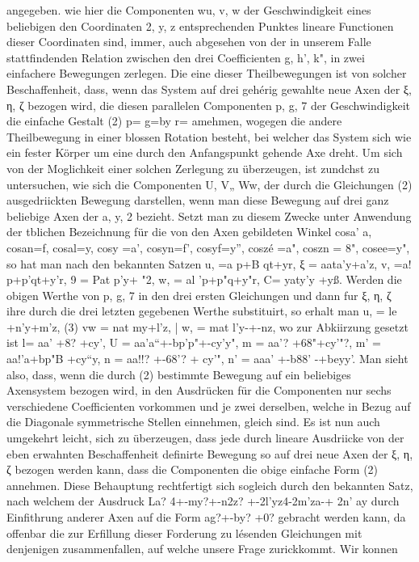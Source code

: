 \documentclass[11pt]{article}
\begin{document}
angegeben.
wie hier die Componenten wu, v, w der Geschwindigkeit eines beliebigen den Coordinaten 2, y, z entsprechenden Punktes lineare Functionen dieser Coordinaten sind, immer,
auch abgesehen von der in unserem Falle stattfindenden Relation zwischen den drei Coefficienten g, h’, k", in zwei einfachere Bewegungen zerlegen. Die eine dieser Theilbewegungen ist von solcher Beschaffenheit, dass, wenn das System auf drei gehérig gewahlte neue
Axen der ξ, η, ζ bezogen wird, die diesen parallelen Componenten p, g, 7 der Geschwindigkeit die einfache Gestalt (2) p= g=by r= amehmen, wogegen die andere Theilbewegung
in einer blossen Rotation besteht, bei welcher das System sich wie ein fester Körper
um eine durch den Anfangspunkt gehende Axe dreht. Um sich von der Moglichkeit einer
solchen Zerlegung zu überzeugen, ist zundchst zu untersuchen, wie sich die Componenten U, V„ Ww, der durch die Gleichungen (2) ausgedriickten Bewegung darstellen, wenn
man diese Bewegung auf drei ganz beliebige Axen der a, y, 2 bezieht. Setzt man zu diesem Zwecke unter Anwendung der tblichen Bezeichnung für die von den Axen gebildeten
Winkel cosa’ a, cosan=f, cosal=y, cosy =a’, cosyn=f’, cosyf=y”, coszé =a", coszn = 8",
cosee=y", so hat man nach den bekannten Satzen u, =a p+B qt+yr, ξ = aata’y+a’z,
v, =a! p+p’qt+y’r, 9 = Pat p’y+ "2, w, = al ’p+p"q+y"r, C= yaty’y +yß. Werden die
obigen Werthe von p, g, 7 in den drei ersten Gleichungen und dann fur ξ, η, ζ ihre durch
die drei letzten gegebenen Werthe substituirt, so erhalt man u, = le +n’y+m’z, (3) vw
= nat my+l’z, | w, = mat l’y-+-nz, wo zur Abkiirzung gesetzt ist l= aa’ +8? +cy’, U =
aa’a“+-bp’p"+-cy’y", m = aa’? +68"+cy’"?, m’ = aa!’a+bp"B +cy“y, n = aa!!? +-68’? +
cy’", n’ = aaa’ +-b88’ -+beyy’.
Man sieht also, dass, wenn die durch (2) bestimmte Bewegung auf ein beliebiges
Axensystem bezogen wird, in den Ausdrücken für die Componenten nur sechs verschiedene Coeﬃcienten vorkommen und je zwei derselben, welche in Bezug auf die Diagonale
symmetrische Stellen einnehmen, gleich sind. Es ist nun auch umgekehrt leicht, sich zu
überzeugen, dass jede durch lineare Ausdriicke von der eben erwahnten Beschaffenheit definirte Bewegung so auf drei neue Axen der ξ, η, ζ bezogen werden kann, dass
die Componenten die obige einfache Form (2) annehmen. Diese Behauptung rechtfertigt
sich sogleich durch den bekannten Satz, nach welchem der Ausdruck La? 4+-my?+-n2z?
+-2l’yz4-2m’za-+ 2n’ ay durch Einfithrung anderer Axen auf die Form ag?+-by? +0? gebracht werden kann, da offenbar die zur Erfillung dieser Forderung zu lésenden Gleichungen mit denjenigen zusammenfallen, auf welche unsere Frage zurickkommt. Wir konnen
\end{document}
